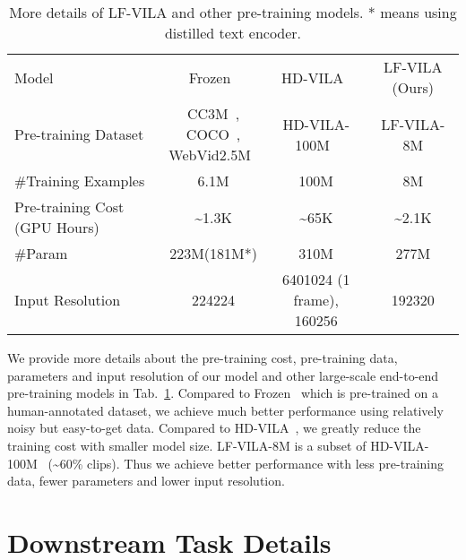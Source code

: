 \documentclass{article}
\begin{document}
\begin{table}[t]
    \small
    \centering
    \caption{More details of LF-VILA and other pre-training models. * means using distilled text encoder.}
    \begin{tabular}{l c c c} 
    \toprule
    Model &Frozen~\cite{bain2021frozen} & HD-VILA~\cite{xue2021hdvila} & LF-VILA (Ours)\\
    \cmidrule{1-4}
    Pre-training Dataset & \makecell[c]{CC3M~\cite{sharma2018conceptual},\\ COCO~\cite{chen2015mscoco},\\ WebVid2.5M~\cite{bain2021frozen}} &HD-VILA-100M~\cite{xue2021hdvila} & LF-VILA-8M \\
    \cmidrule{1-4}
    \#Training Examples & 6.1M & 100M & 8M\\
    \cmidrule{1-4}
    Pre-training Cost (GPU Hours) & \textasciitilde1.3K & \textasciitilde65K & \textasciitilde2.1K\\
    \cmidrule{1-4}
    \#Param & 223M(181M*) & 310M & 277M \\
    \cmidrule{1-4}
    Input Resolution & 224224 & \makecell[c]{6401024 (1 frame), \\ 160256} & 192320 \\
    \bottomrule
    \end{tabular}
    \label{tab:cost}
\end{table}
We provide more details about the pre-training cost, pre-training data, parameters and input resolution of our model and other large-scale end-to-end pre-training models in Tab.~\ref{tab:cost}.
Compared to Frozen~\cite{bain2021frozen} which is pre-trained on a human-annotated dataset, we achieve much better performance using relatively noisy but easy-to-get data. Compared to HD-VILA~\cite{xue2021hdvila}, we greatly reduce the training cost with smaller model size. LF-VILA-8M is a subset of HD-VILA-100M~\cite{xue2021hdvila} (\textasciitilde60\% clips). Thus we achieve better performance with less pre-training data, fewer parameters and lower input resolution.

\section{Downstream Task Details}\label{sec:app_tasks}
\end{document}
